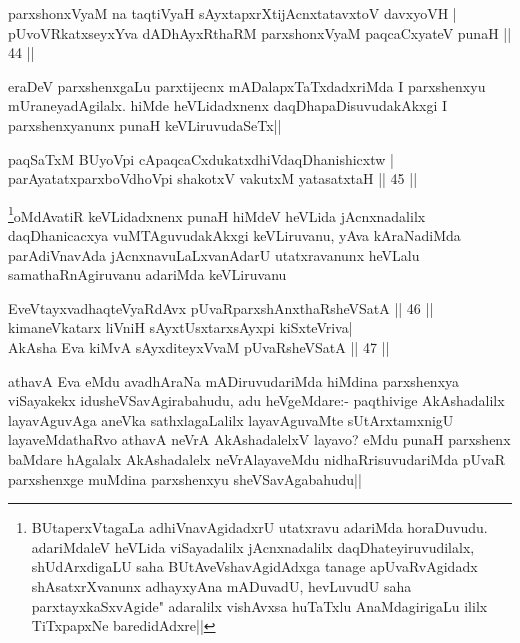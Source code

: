
\begin{shl}
parxshonxV\s yaM na taqtiVyaH sAyxtapxrXtijAcnxtatavxtoV davxyoVH |\\
pUvoVRkatxseyxYva dADhAyxRthaRM parxshonxV\s yaM paqcaCxyateV punaH \hfill || 44 ||
\end{shl}

\begin{artha}
eraDeV parxshenxgaLu parxtijecnx mADalapxTaTxdadxriMda I parxshenxyu mUraneyadAgilalx. hiMde heVLidadxnenx daqDhapaDisuvudakAkxgi I parxshenxyanunx punaH keVLiruvudaSeTx||
\end{artha}

\begin{shl}
paqSaTxM BUyoV\s pi cApaqcaCxdukatxdhiVdaqDhanishicxtw |\\
parAyatatxparxboVdhoV\s pi shakotxV vakutxM yatasatxtaH \hfill || 45 ||
\end{shl}

\begin{artha}
\footnote[1]{BUtaperxVtagaLa adhiVnavAgidadxrU utatxravu adariMda horaDuvudu. adariMdaleV heVLida viSayadalilx jAcnxnadalilx daqDhateyiruvudilalx, shUdArxdigaLU saha BUtAveVshavAgidAdxga tanage apUvaRvAgidadx shAsatxrXvanunx adhayxyAna mADuvadU, hevLuvudU saha parxtayxkaSxvAgide" adaralilx vishAvxsa huTaTxlu AnaMdagirigaLu ililx TiTxpapxNe baredidAdxre||}oMdAvatiR keVLidadxnenx punaH hiMdeV heVLida jAcnxnadalilx daqDhanicacxya vuMTAguvudakAkxgi keVLiruvanu, yAva kAraNadiMda parAdiVnavAda jAcnxnavuLaLxvanAdarU utatxravanunx heVLalu samathaRnAgiruvanu adariMda keVLiruvanu
\end{artha}

\begin{shl}
EveVtayxvadhaqteVyaRdAvx pUvaRparxshAnxthaRsheVSatA \hfill || 46 ||\\
kimaneVkatarx liVniH sAyxtUsxtarxsAyxpi kiSxteVriva|\\
AkAsha Eva kiMvA sAyxditeyxVvaM pUvaRsheVSatA \hfill || 47 ||
\end{shl}

\begin{artha}%
athavA Eva eMdu avadhAraNa mADiruvudariMda hiMdina parxshenxya viSayakekx idusheVSavAgirabahudu, adu heVgeMdare:- paqthivige AkAshadalilx layavAguvAga aneVka sathxlagaLalilx layavAguvaMte sUtArxtamxnigU layaveMdathaRvo athavA neVrA AkAshadalelxV layavo? eMdu punaH parxshenx baMdare hAgalalx AkAshadalelx neVrAlayaveMdu nidhaRrisuvudariMda pUvaR parxshenxge muMdina parxshenxyu sheVSavAgabahudu||
\end{artha}

